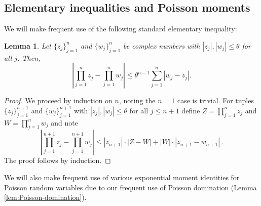 \documentclass[10pt]{amsart}
\newtheorem{lemma}[theorem]{Lemma}
\theoremstyle{definition}
\theoremstyle{remark}
\begin{document}
	\subsection{Elementary inequalities and Poisson moments}
	We will make frequent use of the following standard elementary inequality:
	\begin{lemma}
		\label{lem:complexproductdifference}
		Let $\{z_j\}_{j =1 }^n$ and $\{w_j\}_{j =1 }^n$ be complex numbers with $|z_j|, |w_j| \le \theta$ for all $j$. Then,
		$$
		\left| \prod_{j=1}^n z_j - \prod_{j=1}^n w_j \right| \le \theta^{n-1} \sum_{j=1}^n |w_j - z_j|.
		$$
	\end{lemma}
	\begin{proof}
		We proceed by induction on $n$, noting the $n = 1$ case is trivial. For tuples $\{z_j\}_{j =1 }^{n+1}$ and $\{w_j\}_{j =1 }^{n+1}$ with $|z_j|, |w_j| \le \theta$ for all $j \leq n+1$ define $Z = \prod_{j = 1}^{n} z_j$ and $W = \prod_{j = 1}^{n} w_j$ and note \begin{equation*}
			\left|\prod_{j = 1}^{n+1} z_j - \prod_{j = 1}^{n+1} w_j \right| \leq |z_{n+1}| \cdot |Z - W| + |W| \cdot |z_{n+1} - w_{n+1}|\,.
		\end{equation*}
		The proof follows by induction.
	\end{proof}
	
	We will also make frequent use of various exponential moment identities for Poisson random variables due to our frequent use of Poisson domination (Lemma \ref{lem:Poisson-domination}). 
	
\end{document}
